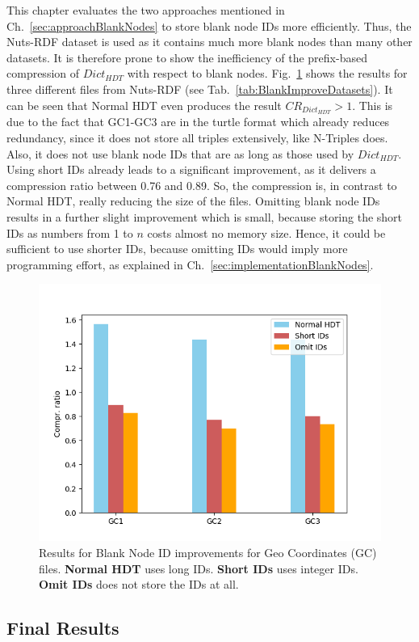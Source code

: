This chapter evaluates the two approaches mentioned in Ch.~\ref{sec:approachBlankNodes} to store blank node IDs more efficiently. Thus, the Nuts-RDF dataset is used as it contains much more blank nodes than many other datasets. It is therefore prone to show the inefficiency of the prefix-based compression of $Dict_{HDT}$ with respect to blank nodes. Fig.~\ref{fig:blanknodes} shows the results for three different files from Nuts-RDF (see Tab.~\ref{tab:BlankImproveDatasets}). It can be seen that Normal HDT even produces the result $CR_{Dict_{HDT}}>1$. This is due to the fact that GC1-GC3 are in the turtle format which already reduces redundancy, since it does not store all triples extensively, like N-Triples does. Also, it does not use blank node IDs that are as long as those used by $Dict_{HDT}$. Using short IDs already leads to a significant improvement, as it delivers a compression ratio between 0.76 and 0.89. So, the compression is, in contrast to Normal HDT, really reducing the size of the files. Omitting blank node IDs results in a further slight improvement which is small, because storing the short IDs as numbers from 1 to $n$ costs almost no memory size. Hence, it could be sufficient to use shorter IDs, because omitting IDs would imply more programming effort, as explained in Ch.~\ref{sec:implementationBlankNodes}.


\begin{figure}
	\centering
	\includegraphics[width=0.7\linewidth]{figures/4_evaluation/blankNodes}
	\caption{Results for Blank Node ID improvements for Geo Coordinates (GC) files. \textbf{Normal HDT} uses long IDs. \textbf{Short IDs} uses integer IDs. \textbf{Omit IDs} does not store the IDs at all.}
	\label{fig:blanknodes}
\end{figure}

\clearpage
\subsection{Final Results}\label{sec:evaluationFinal}

